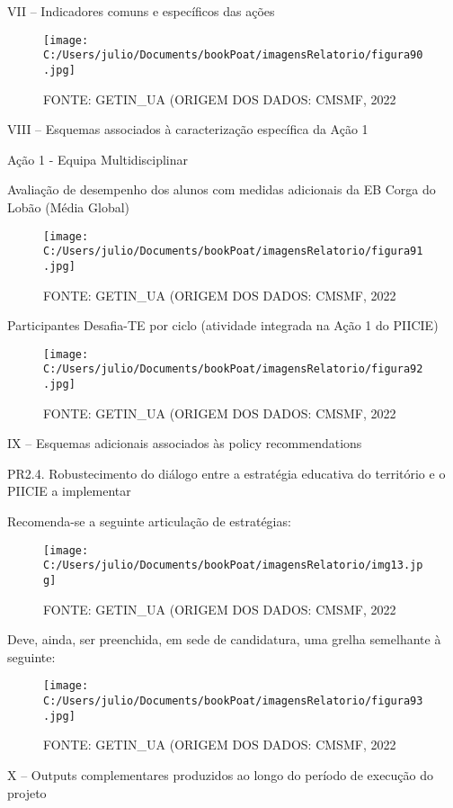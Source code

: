 \documentclass[
]{book}
\begin{document}
VII -- Indicadores comuns e específicos das ações

\begin{figure}
\centering
\texttt{[image: C:/Users/julio/Documents/bookPoat/imagensRelatorio/figura90.jpg]}
\caption{FONTE: GETIN\_UA (ORIGEM DOS DADOS: CMSMF, 2022}
\end{figure}

VIII -- Esquemas associados à caracterização específica da Ação 1

Ação 1 - Equipa Multidisciplinar

Avaliação de desempenho dos alunos com medidas adicionais da EB Corga do Lobão (Média Global)

\begin{figure}
\centering
\texttt{[image: C:/Users/julio/Documents/bookPoat/imagensRelatorio/figura91.jpg]}
\caption{FONTE: GETIN\_UA (ORIGEM DOS DADOS: CMSMF, 2022}
\end{figure}

Participantes Desafia-TE por ciclo (atividade integrada na Ação 1 do PIICIE)

\begin{figure}
\centering
\texttt{[image: C:/Users/julio/Documents/bookPoat/imagensRelatorio/figura92.jpg]}
\caption{FONTE: GETIN\_UA (ORIGEM DOS DADOS: CMSMF, 2022}
\end{figure}

IX -- Esquemas adicionais associados às policy recommendations

\leavevmode{}%
PR2.4. Robustecimento do diálogo entre a estratégia educativa do território e o PIICIE a implementar

Recomenda-se a seguinte articulação de estratégias:

\begin{figure}
\centering
\texttt{[image: C:/Users/julio/Documents/bookPoat/imagensRelatorio/img13.jpg]}
\caption{FONTE: GETIN\_UA (ORIGEM DOS DADOS: CMSMF, 2022}
\end{figure}

Deve, ainda, ser preenchida, em sede de candidatura, uma grelha semelhante à seguinte:

\begin{figure}
\centering
\texttt{[image: C:/Users/julio/Documents/bookPoat/imagensRelatorio/figura93.jpg]}
\caption{FONTE: GETIN\_UA (ORIGEM DOS DADOS: CMSMF, 2022}
\end{figure}

X -- Outputs complementares produzidos ao longo do período de execução do projeto
\end{document}
